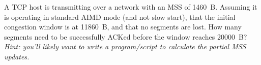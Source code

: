 \documentclass[12pt,addpoints,answers]{exam}
\begin{document}
\begin{questions}
\begin{solution}
\end{solution}

\question[10] A TCP host is transmitting over a network with an MSS of \SI{1460}{B}. Assuming it is operating in standard AIMD mode (and not slow start), that the initial congestion window is at \SI{11860}{B}, and that no segments are lost. How many segments need to be successfully ACKed before the window reaches \SI{20000}{B}?\\\emph{Hint: you'll likely want to write a program/script to calculate the partial MSS updates.}
\begin{solution}
\end{solution}

\end{questions}
\end{document}
